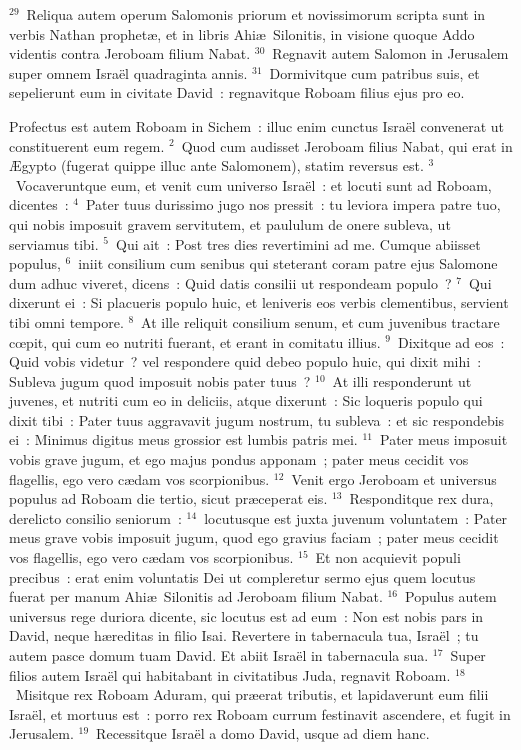 ${}^{29}$~Reliqua autem operum Salomonis priorum et novissimorum scripta sunt in verbis Nathan prophet\ae , et in libris Ahi\ae\ Silonitis, in visione quoque Addo videntis contra Jeroboam filium Nabat.
${}^{30}$~Regnavit autem Salomon in Jerusalem super omnem Isra\"el quadraginta annis.
${}^{31}$~Dormivitque cum patribus suis, et sepelierunt eum in civitate David~: regnavitque Roboam filius ejus pro eo.

\lettrine[lines=10,image=true,loversize=0.05,lraise=-0.03]{P}{}rofectus est autem Roboam in Sichem~: illuc enim cunctus Isra\"el convenerat ut constituerent eum regem.
${}^{2}$~Quod cum audisset Jeroboam filius Nabat, qui erat in \AE gypto (fugerat quippe illuc ante Salomonem), statim reversus est.
${}^{3}$~Vocaveruntque eum, et venit cum universo Isra\"el~: et locuti sunt ad Roboam, dicentes~:
${}^{4}$~Pater tuus durissimo jugo nos pressit~: tu leviora impera patre tuo, qui nobis imposuit gravem servitutem, et paululum de onere subleva, ut serviamus tibi.
${}^{5}$~Qui ait~: Post tres dies revertimini ad me. Cumque abiisset populus,
${}^{6}$~iniit consilium cum senibus qui steterant coram patre ejus Salomone dum adhuc viveret, dicens~: Quid datis consilii ut respondeam populo~?
${}^{7}$~Qui dixerunt ei~: Si placueris populo huic, et leniveris eos verbis clementibus, servient tibi omni tempore.
${}^{8}$~At ille reliquit consilium senum, et cum juvenibus tractare cœpit, qui cum eo nutriti fuerant, et erant in comitatu illius.
${}^{9}$~Dixitque ad eos~: Quid vobis videtur~? vel respondere quid debeo populo huic, qui dixit mihi~: Subleva jugum quod imposuit nobis pater tuus~?
${}^{10}$~At illi responderunt ut juvenes, et nutriti cum eo in deliciis, atque dixerunt~: Sic loqueris populo qui dixit tibi~: Pater tuus aggravavit jugum nostrum, tu subleva~: et sic respondebis ei~: Minimus digitus meus grossior est lumbis patris mei.
${}^{11}$~Pater meus imposuit vobis grave jugum, et ego majus pondus apponam~; pater meus cecidit vos flagellis, ego vero c\ae dam vos scorpionibus.
${}^{12}$~Venit ergo Jeroboam et universus populus ad Roboam die tertio, sicut pr\ae ceperat eis.
${}^{13}$~Responditque rex dura, derelicto consilio seniorum~:
${}^{14}$~locutusque est juxta juvenum voluntatem~: Pater meus grave vobis imposuit jugum, quod ego gravius faciam~; pater meus cecidit vos flagellis, ego vero c\ae dam vos scorpionibus.
${}^{15}$~Et non acquievit populi precibus~: erat enim voluntatis Dei ut compleretur sermo ejus quem locutus fuerat per manum Ahi\ae\ Silonitis ad Jeroboam filium Nabat.
${}^{16}$~Populus autem universus rege duriora dicente, sic locutus est ad eum~: Non est nobis pars in David, neque h\ae reditas in filio Isai. Revertere in tabernacula tua, Isra\"el~; tu autem pasce domum tuam David. Et abiit Isra\"el in tabernacula sua.
${}^{17}$~Super filios autem Isra\"el qui habitabant in civitatibus Juda, regnavit Roboam.
${}^{18}$~Misitque rex Roboam Aduram, qui pr\ae erat tributis, et lapidaverunt eum filii Isra\"el, et mortuus est~: porro rex Roboam currum festinavit ascendere, et fugit in Jerusalem.
${}^{19}$~Recessitque Isra\"el a domo David, usque ad diem hanc.

